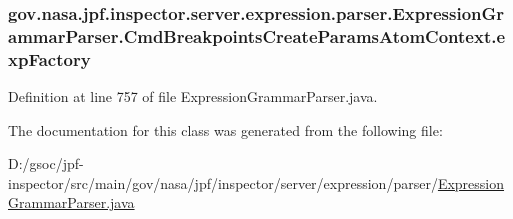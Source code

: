 \subsubsection[{\texorpdfstring{exp\+Factory}{expFactory}}]{ gov.\+nasa.\+jpf.\+inspector.\+server.\+expression.\+parser.\+Expression\+Grammar\+Parser.\+Cmd\+Breakpoints\+Create\+Params\+Atom\+Context.\+exp\+Factory}\hypertarget{classgov_1_1nasa_1_1jpf_1_1inspector_1_1server_1_1expression_1_1parser_1_1_expression_grammar_paa3acc222754f42ff002c5d98d8d38136_adb23e6d9ce49bb3c885710e9b54f5bb8}{}\label{classgov_1_1nasa_1_1jpf_1_1inspector_1_1server_1_1expression_1_1parser_1_1_expression_grammar_paa3acc222754f42ff002c5d98d8d38136_adb23e6d9ce49bb3c885710e9b54f5bb8}


Definition at line 757 of file Expression\+Grammar\+Parser.\+java.



The documentation for this class was generated from the following file\+:\begin{DoxyCompactItemize}
\item 
D\+:/gsoc/jpf-\/inspector/src/main/gov/nasa/jpf/inspector/server/expression/parser/\hyperlink{_expression_grammar_parser_8java}{Expression\+Grammar\+Parser.\+java}\end{DoxyCompactItemize}
